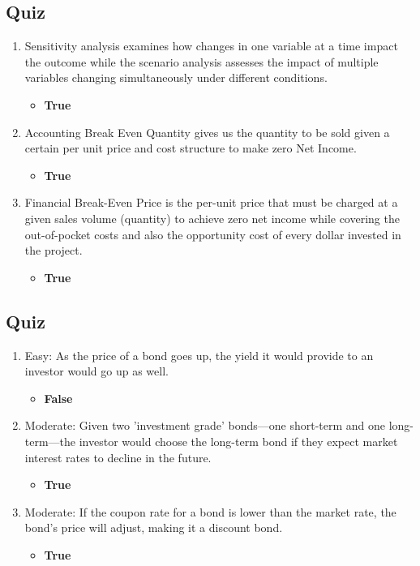 \begin{tiny}
  \subsection{Quiz}
  \begin{enumerate}[itemsep=-0.5em]
    \item Sensitivity analysis examines how changes in one variable at a time impact the outcome while the scenario analysis assesses the impact of multiple variables changing simultaneously under different conditions.
          \begin{itemize}[itemsep=-0.2em]
            \item \textbf{True}
          \end{itemize}
    \item Accounting Break Even Quantity gives us the quantity to be sold given a certain per unit price and cost structure to make zero Net Income.
          \begin{itemize}[itemsep=-0.2em]
            \item \textbf{True}
          \end{itemize}
    \item Financial Break-Even Price is the per-unit price that must be charged at a given sales volume (quantity) to achieve zero net income while covering the out-of-pocket costs and also the opportunity cost of every dollar invested in the project.
          \begin{itemize}[itemsep=-0.2em]
            \item \textbf{True}
          \end{itemize}
  \end{enumerate}
  \subsection{Quiz}
  \begin{enumerate}[itemsep=-0.5em]
    \item Easy: As the price of a bond goes up, the yield it would provide to an investor would go up as well.
          \begin{itemize}[itemsep=-0.2em]
            \item \textbf{False}
          \end{itemize}
    \item Moderate: Given two 'investment grade' bonds—one short-term and one long-term—the investor would choose the long-term bond if they expect market interest rates to decline in the future.
          \begin{itemize}[itemsep=-0.2em]
            \item \textbf{True}
          \end{itemize}
    \item Moderate: If the coupon rate for a bond is lower than the market rate, the bond's price will adjust, making it a discount bond.
          \begin{itemize}[itemsep=-0.2em]
            \item \textbf{True}
          \end{itemize}
  \end{enumerate}

\end{tiny}

